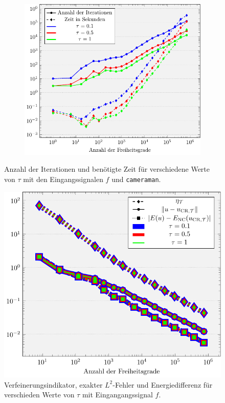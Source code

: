 \begin{figure}[p]
\begin{subfigure}[b]{.48\linewidth}
    \includegraphics[width=\linewidth]
      {pictures/chapExperiments/secParameters/parTau/cam/miscCam.pdf}
    \label{fig:parTauMiscCam}
  \end{subfigure}
  \caption{Anzahl der Iterationen und benötigte Zeit für verschiedene Werte
  von $\tau$ mit den Eingangssignalen $f$ und \texttt{cameraman}.}
  \label{fig:parTauMisc}
\end{figure}
\begin{figure}[p]
  \centering
  \includegraphics[width=\linewidth]
    {pictures/chapExperiments/secParameters/parTau/f01/convergenceF.pdf}
  \caption{Verfeinerungsindikator, exakter $L^2$-Fehler und Energiedifferenz 
  für verschieden Werte von $\tau$ mit Eingangangssignal $f$.}
  \label{fig:parTauConvergence}
\end{figure}
